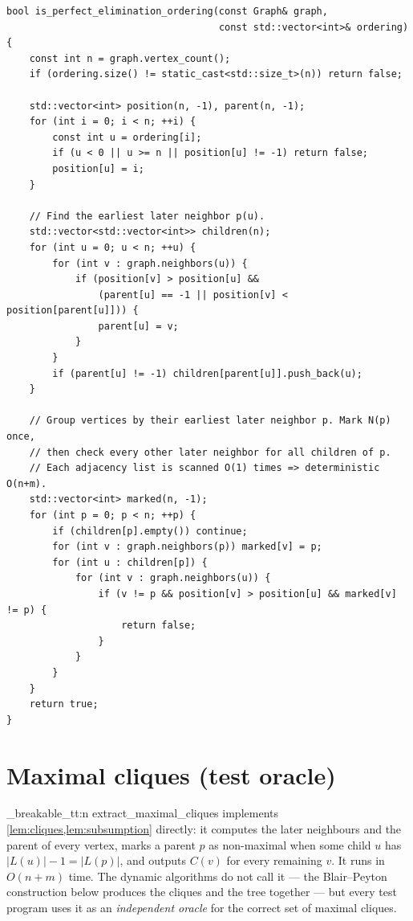 \documentclass[11pt,a4paper,oneside]{report}
\theoremstyle{plain}
\theoremstyle{definition}
\theoremstyle{remark}
\DeclareRobustCommand{\code}[1]{\mtp_breakable_tt:n {#1}}
\DeclareRobustCommand{\file}[1]{\mtp_breakable_tt:n {#1}}
\begin{document}
\begin{lstlisting}[style=cpp,firstnumber=54,caption={\file{src/mcs.cpp}, lines 54--94: the linear-time PEO test.},label={lst:peo}]
bool is_perfect_elimination_ordering(const Graph& graph,
                                     const std::vector<int>& ordering) {
    const int n = graph.vertex_count();
    if (ordering.size() != static_cast<std::size_t>(n)) return false;

    std::vector<int> position(n, -1), parent(n, -1);
    for (int i = 0; i < n; ++i) {
        const int u = ordering[i];
        if (u < 0 || u >= n || position[u] != -1) return false;
        position[u] = i;
    }

    // Find the earliest later neighbor p(u).
    std::vector<std::vector<int>> children(n);
    for (int u = 0; u < n; ++u) {
        for (int v : graph.neighbors(u)) {
            if (position[v] > position[u] &&
                (parent[u] == -1 || position[v] < position[parent[u]])) {
                parent[u] = v;
            }
        }
        if (parent[u] != -1) children[parent[u]].push_back(u);
    }

    // Group vertices by their earliest later neighbor p. Mark N(p) once,
    // then check every other later neighbor for all children of p.
    // Each adjacency list is scanned O(1) times => deterministic O(n+m).
    std::vector<int> marked(n, -1);
    for (int p = 0; p < n; ++p) {
        if (children[p].empty()) continue;
        for (int v : graph.neighbors(p)) marked[v] = p;
        for (int u : children[p]) {
            for (int v : graph.neighbors(u)) {
                if (v != p && position[v] > position[u] && marked[v] != p) {
                    return false;
                }
            }
        }
    }
    return true;
}
\end{lstlisting}

\section{Maximal cliques (test oracle)}\label{sec:cliques-code}
\code{extract_maximal_cliques} implements \cref{lem:cliques,lem:subsumption} directly: it
computes the later neighbours and the parent of every vertex, marks a parent \(p\) as
non-maximal when some child \(u\) has \(|L(u)|-1=|L(p)|\), and outputs \(C(v)\) for every
remaining \(v\). It runs in \(O(n+m)\) time. The dynamic algorithms do not call it --- the
Blair--Peyton construction below produces the cliques and the tree together --- but every test
program uses it as an \emph{independent oracle} for the correct set of maximal cliques.
\end{document}
